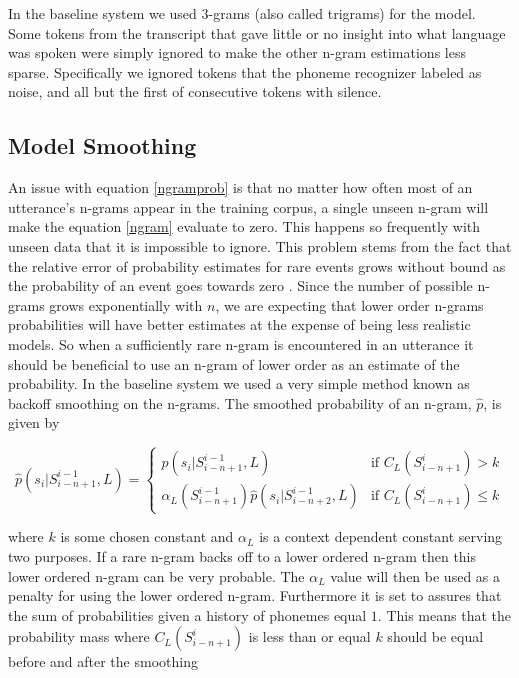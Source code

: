 In the baseline system we used 3-grams (also called trigrams) for the model. Some tokens from the transcript that gave little or no insight into what language was spoken were simply ignored to make the other n-gram estimations less sparse. Specifically we ignored tokens that the phoneme recognizer labeled as noise, and all but the first of consecutive tokens with silence. 

\subsection{Model Smoothing}

\label{ngramsmooth}

An issue with equation \ref{ngramprob} is that no matter how often most of an utterance's n-grams appear in the training corpus, a single unseen n-gram will make the equation \ref{ngram} evaluate to zero. This happens so frequently with unseen data that it is impossible to ignore. This problem stems from the fact that the relative error of probability estimates for rare events grows without bound as the probability of an event goes towards zero \cite{probestimate}. Since the number of possible n-grams grows exponentially with $n$, we are expecting that lower order n-grams probabilities will have better estimates at the expense of being less realistic models. So when a sufficiently rare n-gram is encountered in an utterance it should be beneficial to use an n-gram of lower order as an estimate of the probability. In the baseline system we used a very simple method known as backoff smoothing \cite[section 11.4.2]{talegk} on the n-grams. The smoothed probability of an n-gram, $\hat{p}$, is given by

\begin{equation}\label{smoothedngram}
\hat{p}(s_i | S_{i-n+1}^{i-1}, L)= 
\begin{cases}
p(s_i | S_{i-n+1}^{i-1}, L) & \text{if } C_L(S_{i-n+1}^i) > k \\
\alpha_L (S_{i-n+1}^{i-1})\hat{p}(s_i | S_{i-n+2}^{i-1}, L) & \text{if } C_L(S_{i-n+1}^i) \leq k
\end{cases}
\end{equation}

where $k$ is some chosen constant and $\alpha_L$ is a context dependent constant serving two purposes. If a rare n-gram backs off to a lower ordered n-gram then this lower ordered n-gram can be very probable. The $\alpha_L$ value will then be used as a penalty for using the lower ordered n-gram. Furthermore it is set to assures that the sum of probabilities given a history of phonemes equal $1$. This means that the probability mass where $C_L(S_{i-n+1}^i)$ is less than or equal $k$ should be equal before and after the smoothing

